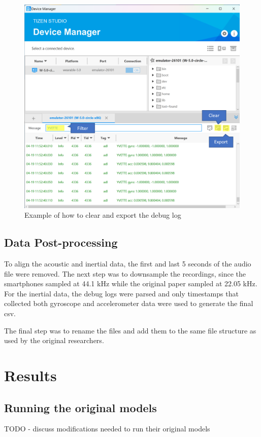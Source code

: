 \documentclass[conference]{IEEEtran}
\begin{document}
	\begin{figure}[h]
		\centering
		\includegraphics[scale=0.60]{DeviceManager}
		\caption{Example of how to clear and export the debug log}
		\label{fig: DeviceManager}
	\end{figure}
	
	\subsection{Data Post-processing}
	To align the acoustic and inertial data, the first and last 5 seconds of the audio file were removed.
	The next step was to downsample the recordings, since the smartphones sampled at 44.1 kHz while the original paper sampled at 22.05 kHz.
	For the inertial data, the debug logs were parsed and only timestamps that collected both gyroscope and accelerometer data were used to generate the final csv.
	
	The final step was to rename the files and add them to the same file structure as used by the original researchers.
	
	\section{Results}
	\subsection{Running the original models}
	TODO - discuss modifications needed to run their original models
	
\end{document}
